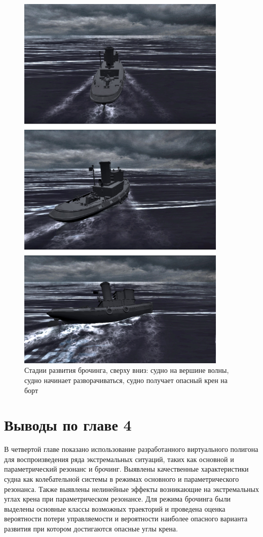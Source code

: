 \begin{figure}
\begin{center}
	\includegraphics[width=100mm]{images/exp_broaching2/shots/movie}
	\caption{Стадии развития брочинга, сверху вниз: судно на вершине волны, судно начинает разворачиваться, судно получает опасный крен на борт}
	\label{exp:broaching_movie}
\end{center}
\end{figure}



\section{Выводы по главе 4}

В четвертой главе показано использование разработанного виртуального полигона для воспроизведения ряда 
экстремальных ситуаций, таких как основной и параметрический резонанс и брочинг.
Выявлены качественные характеристики судна как колебательной системы в режимах основного и параметрического резонанса.
Также выявлены нелинейные эффекты возникающие на экстремальных углах крена при параметрическом резонансе.
Для режима брочинга были выделены основные классы возможных траекторий и проведена оценка вероятности потери управляемости и вероятности наиболее опасного варианта развития при котором достигаются опасные углы крена.






